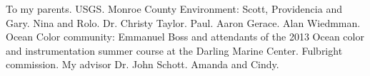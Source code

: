 \documentclass{book}
\let\stdsection\chapter
\renewcommand\chapter{\newpage\stdsection}
\begin{document}
\begin{acknowledgements}
\setlength{\parindent}{20pt}
To my parents. USGS. Monroe County Environment: Scott, Providencia and Gary. Nina and Rolo. Dr. Christy Taylor. Paul. Aaron Gerace. Alan Wiedmman. Ocean Color community: Emmanuel Boss and attendants of the 2013 Ocean color and instrumentation summer course at the Darling Marine Center. Fulbright commission. My advisor Dr. John Schott. Amanda and Cindy.
\end{acknowledgements}

\tableofcontents

\listoffigures
{}

\listoftables
{}



% 
% 
% 
% 
% 

\listoftodos

%
%



\end{document}
